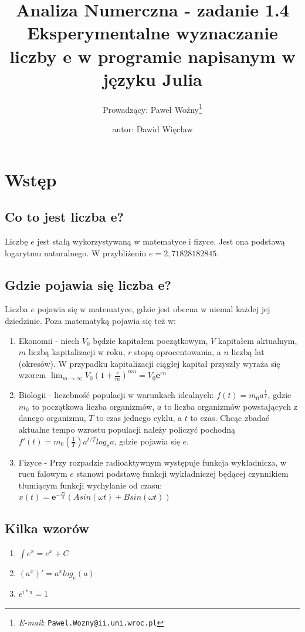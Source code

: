 \documentclass{article}
\title{\centering \Large Analiza Numerczna - zadanie 1.4 \\
\large Eksperymentalne wyznaczanie liczby e w programie napisanym w języku Julia}
\author{\Large Prowadzący: Paweł Woźny\thanks{\textit{E-mail}: \texttt{Pawel.Wozny@ii.uni.wroc.pl}}%
	    \and \Large autor: Dawid Więcław}
\begin{document}
\maketitle
\thispagestyle{empty}
\setcounter{page}{1}
\section{Wstęp}
\subsection{Co to jest liczba e?}
\large
\hspace{3mm} Liczbę $e$ jest stałą wykorzystywaną w matematyce i fizyce. Jest ona podstawą logarytmu naturalnego. W przybliżeniu $e=2,71828182845$.
\subsection{Gdzie pojawia się liczba e?}
\hspace{3mm} Liczba $e$ pojawia się w matematyce, gdzie jest obecna w niemal każdej jej dziedzinie. Poza matematyką pojawia się też w:
\begin{enumerate}
\item Ekonomii - niech $V_{0}$ będzie kapitałem początkowym, $V$ kapitałem aktualnym, $m$ liczbą kapitalizacji w roku, $r$ stopą oprocentowania, a $n$ liczbą lat (okresów). W przypadku kapitalizacji ciągłej kapitał przyszły wyraża się wzorem $\lim_{m\to\infty}{V_{0}(1+\frac{r}{m})^{mn}} = V_{0}\textbf{e}^{rn}$
\item Biologii - liczebność populacji w warunkach idealnych: $f(t)=m_{0}a^{\frac{t}{T}}$, gdzie $m_{0}$ to początkowa liczba organizmów, $a$ to liczba organizmów powstających z danego organizmu, $T$ to czas jednego cyklu, a $t$ to czas. Chcąc zbadać aktualne tempo wzrostu populacji należy policzyć pochodną $f'(t) = m_{0}(\frac{1}{T})a^{t/T}log_{\textbf{e}}{a}$, gdzie pojawia się $e$.
\item Fizyce - Przy rozpadzie radioaktywnym występuje funkcja wykładnicza, w rucu falowym $e$ stanowi podstawę funkcji wykładniczej będącej czynnikiem tłumiącym funkcji wychylanie od czasu: $x(t) = \textbf{e}^{-\frac{\Gamma t}{2}}(Asin(\omega t)+Bsin(\omega t))$
\end{enumerate}
\subsection{Kilka wzorów}
\begin{enumerate}
\item $\int e^{x} = e^{x} + C$
\item $(a^{x})' = a^{x}log_{e}(a)$
\item $e^{i*\pi}=1$
\end{enumerate}
\end{document}
